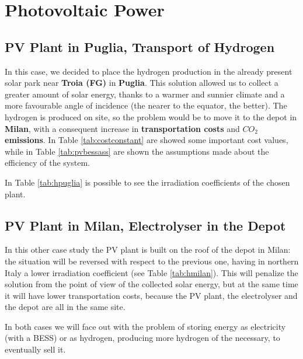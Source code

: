 \section{Photovoltaic Power}

\subsection{PV Plant in Puglia, Transport of Hydrogen}
In this case, we decided to place the hydrogen production in the  already present solar park near \textbf{Troia (FG)} in \textbf{Puglia}. This solution allowed us to collect a greater amount of solar energy, thanks to a warmer and sunnier climate and a more favourable angle of incidence (the nearer to the equator, the better). The hydrogen is produced on site, so the problem would be to move it to the depot in \textbf{Milan}, with a consequent increase in \textbf{transportation costs} and \textbf{$CO_2$ emissions}. In Table \ref{tab:costconstant} are showed some important cost values, while in Table \ref{tab:pvbessass} are shown the assumptions made about the efficiency of the system.




\newpage
In Table \ref{tab:hpuglia} is possible to see the irradiation coefficients of the chosen plant.



\subsection{PV Plant in Milan, Electrolyser in the Depot}
In this other case study the PV plant is built on the roof of the depot in Milan: the situation will be reversed with respect to the previous one, having in northern Italy a lower irradiation coefficient (see Table \ref{tab:hmilan}). This will penalize the solution from the point of view of the collected solar energy, but at the same time it will have lower transportation costs, because the PV plant, the electrolyser and the depot are all in the same site.



In both cases we will face out with the problem of storing energy as electricity (with a BESS) or as hydrogen, producing more hydrogen of the necessary, to eventually sell it.
